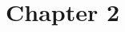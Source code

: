 \documentclass[11pt]{unc_dissertation}
\begin{document}
\chapter{Chapter 2}



\backmatter




\appendix
\chapter{}
\section{}
\end{document}
